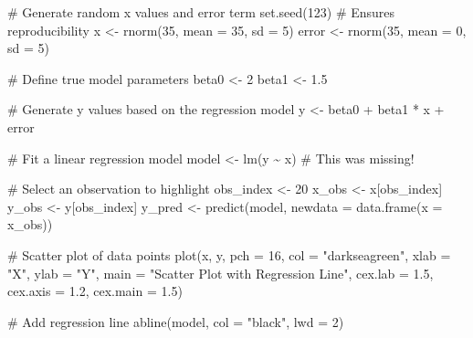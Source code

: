\documentclass[
  letterpaper,
]{book}
\newenvironment{Shaded}{\begin{snugshade}}{\end{snugshade}}
\newcommand{\AttributeTok}[1]{\textcolor[rgb]{0.40,0.45,0.13}{#1}}
\newcommand{\CommentTok}[1]{\textcolor[rgb]{0.37,0.37,0.37}{#1}}
\newcommand{\DecValTok}[1]{\textcolor[rgb]{0.68,0.00,0.00}{#1}}
\newcommand{\FloatTok}[1]{\textcolor[rgb]{0.68,0.00,0.00}{#1}}
\newcommand{\FunctionTok}[1]{\textcolor[rgb]{0.28,0.35,0.67}{#1}}
\newcommand{\NormalTok}[1]{\textcolor[rgb]{0.00,0.23,0.31}{#1}}
\newcommand{\OtherTok}[1]{\textcolor[rgb]{0.00,0.23,0.31}{#1}}
\newcommand{\SpecialCharTok}[1]{\textcolor[rgb]{0.37,0.37,0.37}{#1}}
\newcommand{\StringTok}[1]{\textcolor[rgb]{0.13,0.47,0.30}{#1}}
\begin{document}
\begin{Shaded}
\begin{Highlighting}[]
\CommentTok{\# Generate random x values and error term}
\FunctionTok{set.seed}\NormalTok{(}\DecValTok{123}\NormalTok{)  }\CommentTok{\# Ensures reproducibility}
\NormalTok{x }\OtherTok{\textless{}{-}} \FunctionTok{rnorm}\NormalTok{(}\DecValTok{35}\NormalTok{, }\AttributeTok{mean =} \DecValTok{35}\NormalTok{, }\AttributeTok{sd =} \DecValTok{5}\NormalTok{)}
\NormalTok{error }\OtherTok{\textless{}{-}} \FunctionTok{rnorm}\NormalTok{(}\DecValTok{35}\NormalTok{, }\AttributeTok{mean =} \DecValTok{0}\NormalTok{, }\AttributeTok{sd =} \DecValTok{5}\NormalTok{)}

\CommentTok{\# Define true model parameters}
\NormalTok{beta0 }\OtherTok{\textless{}{-}} \DecValTok{2}
\NormalTok{beta1 }\OtherTok{\textless{}{-}} \FloatTok{1.5}

\CommentTok{\# Generate y values based on the regression model}
\NormalTok{y }\OtherTok{\textless{}{-}}\NormalTok{ beta0 }\SpecialCharTok{+}\NormalTok{ beta1 }\SpecialCharTok{*}\NormalTok{ x }\SpecialCharTok{+}\NormalTok{ error}

\CommentTok{\# Fit a linear regression model}
\NormalTok{model }\OtherTok{\textless{}{-}} \FunctionTok{lm}\NormalTok{(y }\SpecialCharTok{\textasciitilde{}}\NormalTok{ x)  }\CommentTok{\# This was missing!}

\CommentTok{\# Select an observation to highlight}
\NormalTok{obs\_index }\OtherTok{\textless{}{-}} \DecValTok{20}  
\NormalTok{x\_obs }\OtherTok{\textless{}{-}}\NormalTok{ x[obs\_index]}
\NormalTok{y\_obs }\OtherTok{\textless{}{-}}\NormalTok{ y[obs\_index]}
\NormalTok{y\_pred }\OtherTok{\textless{}{-}} \FunctionTok{predict}\NormalTok{(model, }\AttributeTok{newdata =} \FunctionTok{data.frame}\NormalTok{(}\AttributeTok{x =}\NormalTok{ x\_obs))  }

\CommentTok{\# Scatter plot of data points}
\FunctionTok{plot}\NormalTok{(x, y, }\AttributeTok{pch =} \DecValTok{16}\NormalTok{, }\AttributeTok{col =} \StringTok{"darkseagreen"}\NormalTok{,}
     \AttributeTok{xlab =} \StringTok{"X"}\NormalTok{, }\AttributeTok{ylab =} \StringTok{"Y"}\NormalTok{,}
     \AttributeTok{main =} \StringTok{"Scatter Plot with Regression Line"}\NormalTok{,}
     \AttributeTok{cex.lab =} \FloatTok{1.5}\NormalTok{, }\AttributeTok{cex.axis =} \FloatTok{1.2}\NormalTok{, }\AttributeTok{cex.main =} \FloatTok{1.5}\NormalTok{)}

\CommentTok{\# Add regression line}
\FunctionTok{abline}\NormalTok{(model, }\AttributeTok{col =} \StringTok{"black"}\NormalTok{, }\AttributeTok{lwd =} \DecValTok{2}\NormalTok{)}


\end{Highlighting}
\end{Shaded}
\end{document}

